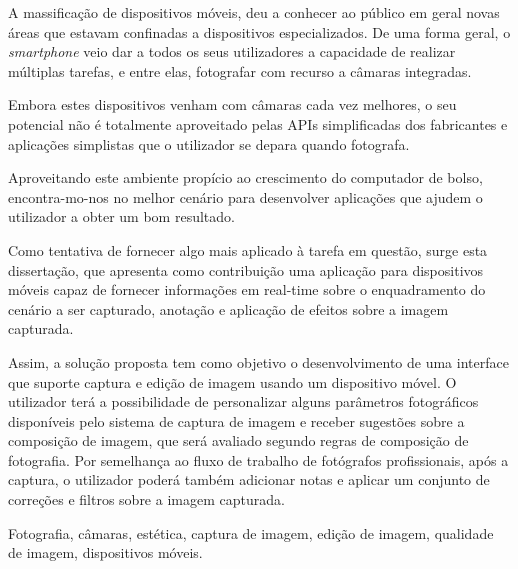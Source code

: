 \abstractPT 

A massificação de dispositivos móveis, deu a conhecer ao público em geral novas áreas que estavam confinadas a dispositivos especializados. De uma forma geral, o \emph{smartphone} veio dar a todos os seus utilizadores a capacidade de realizar múltiplas tarefas, e entre elas, fotografar com recurso a câmaras integradas.


Embora estes dispositivos venham com câmaras cada vez melhores, o seu potencial não é totalmente aproveitado pelas APIs simplificadas dos fabricantes e aplicações simplistas que o utilizador se depara quando fotografa.


Aproveitando este ambiente propício ao crescimento do computador de bolso, encontra-mo-nos no melhor cenário para desenvolver aplicações que ajudem o utilizador a obter um bom resultado.


Como tentativa de fornecer algo mais aplicado à tarefa em questão, surge esta dissertação, que apresenta como contribuição uma aplicação para dispositivos móveis capaz de fornecer informações em real-time sobre o enquadramento do cenário a ser capturado, anotação e aplicação de efeitos sobre a imagem capturada.



Assim, a solução proposta tem como objetivo o desenvolvimento de uma interface que suporte captura e edição de imagem usando um dispositivo móvel. O utilizador terá a possibilidade de personalizar alguns parâmetros fotográficos disponíveis pelo sistema de captura de imagem e receber sugestões sobre a composição de imagem, que será avaliado segundo regras de composição de fotografia. Por semelhança ao fluxo de trabalho de fotógrafos profissionais, após a captura, o utilizador poderá também adicionar notas e aplicar um conjunto de correções e filtros sobre a imagem capturada.

\begin{keywords}
Fotografia, câmaras, estética, captura de imagem, edição de imagem, qualidade de imagem, dispositivos móveis.
\end{keywords}
